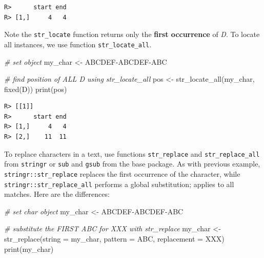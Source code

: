 \documentclass[
  12pt,
]{book}
\newenvironment{Shaded}{\begin{snugshade}}{\end{snugshade}}
\newcommand{\AttributeTok}[1]{\textcolor[rgb]{0.61,0.61,0.61}{#1}}
\newcommand{\CommentTok}[1]{\textcolor[rgb]{0.37,0.37,0.37}{\textit{#1}}}
\newcommand{\FunctionTok}[1]{\textcolor[rgb]{0,0,0}{#1}}
\newcommand{\NormalTok}[1]{#1}
\newcommand{\OtherTok}[1]{\textcolor[rgb]{0.37,0.37,0.37}{#1}}
\newcommand{\StringTok}[1]{\textcolor[rgb]{0.5,0.5,0.5}{#1}}
\begin{document}
\begin{verbatim}
R>      start end
R> [1,]     4   4
\end{verbatim}

Note the \texttt{str\_locate} function returns only the \textbf{first occurrence} of \emph{D}. To locate all instances, we use function \texttt{str\_locate\_all}.

\begin{Shaded}
\begin{Highlighting}[]
\CommentTok{\# set object}
\NormalTok{my\_char }\OtherTok{\textless{}{-}} \StringTok{\textquotesingle{}ABCDEF{-}ABCDEF{-}ABC\textquotesingle{}}

\CommentTok{\# find position of ALL \textquotesingle{}D\textquotesingle{} using str\_locate\_all}
\NormalTok{pos }\OtherTok{\textless{}{-}} \FunctionTok{str\_locate\_all}\NormalTok{(my\_char, }\FunctionTok{fixed}\NormalTok{(}\StringTok{\textquotesingle{}D\textquotesingle{}}\NormalTok{))}
\FunctionTok{print}\NormalTok{(pos)}
\end{Highlighting}
\end{Shaded}

\begin{verbatim}
R> [[1]]
R>      start end
R> [1,]     4   4
R> [2,]    11  11
\end{verbatim}

To replace characters in a text, use functions \texttt{str\_replace} and \texttt{str\_replace\_all} from \texttt{stringr} or \texttt{sub} and \texttt{gsub} from the base package. As with previous example, \texttt{stringr::str\_replace} replaces the first occurrence of the character, while \texttt{stringr::str\_replace\_all} performs a global substitution; applies to all matches. Here are the differences:    

\begin{Shaded}
\begin{Highlighting}[]
\CommentTok{\# set char object}
\NormalTok{my\_char }\OtherTok{\textless{}{-}} \StringTok{\textquotesingle{}ABCDEF{-}ABCDEF{-}ABC\textquotesingle{}}

\CommentTok{\# substitute the FIRST \textquotesingle{}ABC\textquotesingle{} for \textquotesingle{}XXX\textquotesingle{} with str\_replace}
\NormalTok{my\_char }\OtherTok{\textless{}{-}} \FunctionTok{str\_replace}\NormalTok{(}\AttributeTok{string =}\NormalTok{ my\_char,}
                       \AttributeTok{pattern =} \StringTok{\textquotesingle{}ABC\textquotesingle{}}\NormalTok{,}
                       \AttributeTok{replacement =} \StringTok{\textquotesingle{}XXX\textquotesingle{}}\NormalTok{)}
\FunctionTok{print}\NormalTok{(my\_char)}
\end{Highlighting}
\end{Shaded}
\end{document}
